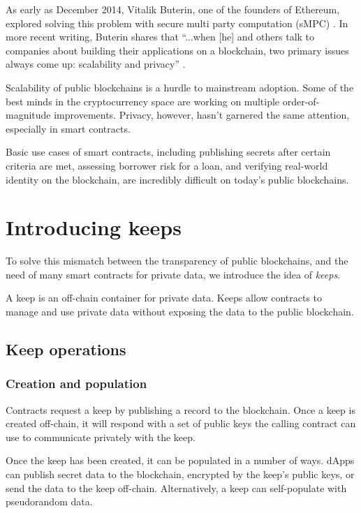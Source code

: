 \documentclass[11pt]{article}
\begin{document}
As early as December 2014, Vitalik Buterin, one of the founders of
Ethereum, explored solving this problem with secure multi party
computation (sMPC) \cite{secretSharingDaos}. In more recent writing,
Buterin shares that “...when [he] and others talk to companies about
building their applications on a blockchain, two primary issues always
come up: scalability and privacy” \cite{privacyOnTheBlockchain}.

Scalability of public blockchains is a hurdle to mainstream adoption.
Some of the best minds in the cryptocurrency space \cite{lightning}
\cite{ethereumSharding} \cite{plasma} are working on multiple
order-of-magnitude improvements. Privacy, however, hasn’t garnered the
same attention, especially in smart contracts.

Basic use cases of smart contracts, including publishing secrets after
certain criteria are met, assessing borrower risk for a loan, and
verifying real-world identity on the blockchain, are incredibly
difficult on today’s public blockchains.

\section{Introducing keeps}

To solve this mismatch between the transparency of public blockchains,
and the need of many smart contracts for private data, we introduce
the idea of {\em keeps}.

A keep is an off-chain container for private data. Keeps allow
contracts to manage and use private data without exposing the data to
the public blockchain.

\subsection{Keep operations}

\subsubsection{Creation and population}

Contracts request a keep by publishing a record to the blockchain.
Once a keep is created off-chain, it will respond with a set of public
keys the calling contract can use to communicate privately with the
keep.

Once the keep has been created, it can be populated in a number of
ways. dApps can publish secret data to the blockchain, encrypted by
the keep’s public keys, or send the data to the keep off-chain.
Alternatively, a keep can self-populate with pseudorandom data.
\end{document}
